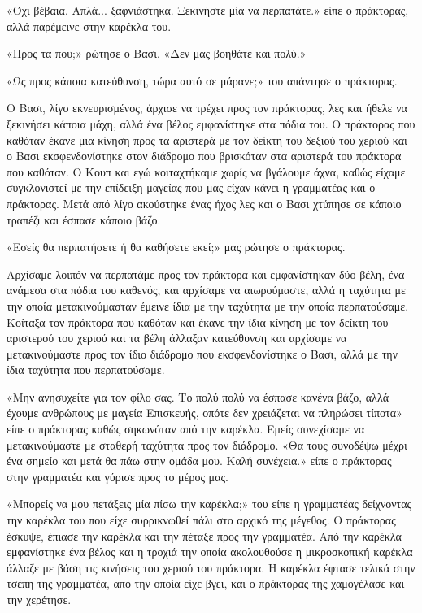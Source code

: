 \documentclass[12pt,twoside, openany]{book}
\begin{document}
«Όχι βέβαια. Απλά... ξαφνιάστηκα. Ξεκινήστε μία να περπατάτε.» είπε ο πράκτορας, αλλά παρέμεινε στην καρέκλα του.

«Προς τα που;» ρώτησε ο Βασι. «Δεν μας βοηθάτε και πολύ.»

«Ως προς κάποια κατεύθυνση, τώρα αυτό σε μάρανε;» του απάντησε ο πράκτορας.

Ο Βασι, λίγο εκνευρισμένος, άρχισε να τρέχει προς τον πράκτορας, λες και ήθελε να ξεκινήσει κάποια μάχη, αλλά ένα βέλος εμφανίστηκε στα πόδια του. Ο πράκτορας που καθόταν έκανε μια κίνηση προς τα αριστερά με τον δείκτη του δεξιού του χεριού και ο Βασι εκσφενδονίστηκε στον διάδρομο που βρισκόταν στα αριστερά του πράκτορα που καθόταν. Ο Κουπ και εγώ κοιταχτήκαμε χωρίς να βγάλουμε άχνα, καθώς είχαμε συγκλονιστεί με την επίδειξη μαγείας που μας είχαν κάνει η γραμματέας και ο πράκτορας. Μετά από λίγο ακούστηκε ένας ήχος λες και ο Βασι χτύπησε σε κάποιο τραπέζι και έσπασε κάποιο βάζο.

«Εσείς θα περπατήσετε ή θα καθήσετε εκεί;» μας ρώτησε ο πράκτορας.

Αρχίσαμε λοιπόν να περπατάμε προς τον πράκτορα και εμφανίστηκαν δύο βέλη, ένα ανάμεσα στα πόδια του καθενός, και αρχίσαμε να αιωρούμαστε, αλλά η ταχύτητα με την οποία μετακινούμασταν έμεινε ίδια με την ταχύτητα με την οποία περπατούσαμε. Κοίταξα τον πράκτορα που καθόταν και έκανε την ίδια κίνηση με τον δείκτη του αριστερού του χεριού και τα βέλη άλλαξαν κατεύθυνση και αρχίσαμε να μετακινούμαστε προς τον ίδιο διάδρομο που εκσφενδονίστηκε ο Βασι, αλλά με την ίδια ταχύτητα που περπατούσαμε.

«Μην ανησυχείτε για τον φίλο σας. Το πολύ πολύ να έσπασε κανένα βάζο, αλλά έχουμε ανθρώπους με μαγεία Επισκευής, οπότε δεν χρειάζεται να πληρώσει τίποτα» είπε ο πράκτορας καθώς σηκωνόταν από την καρέκλα. Εμείς συνεχίσαμε να μετακινούμαστε με σταθερή ταχύτητα προς τον διάδρομο. «Θα τους συνοδέψω μέχρι ένα σημείο και μετά θα πάω στην ομάδα μου. Καλή συνέχεια.» είπε ο πράκτορας στην γραμματέα και γύρισε προς το μέρος μας. 

«Μπορείς να μου πετάξεις μία πίσω την καρέκλα;» του είπε η γραμματέας δείχνοντας την καρέκλα του που είχε συρρικνωθεί πάλι στο αρχικό της μέγεθος. Ο πράκτορας έσκυψε, έπιασε την καρέκλα και την πέταξε προς την γραμματέα. Από την καρέκλα εμφανίστηκε ένα βέλος και η τροχιά την οποία ακολουθούσε η μικροσκοπική καρέκλα άλλαζε με βάση τις κινήσεις του χεριού του πράκτορα. Η καρέκλα έφτασε τελικά στην τσέπη της γραμματέα, από την οποία είχε βγει, και ο πράκτορας της χαμογέλασε και την χερέτησε.
\end{document}
